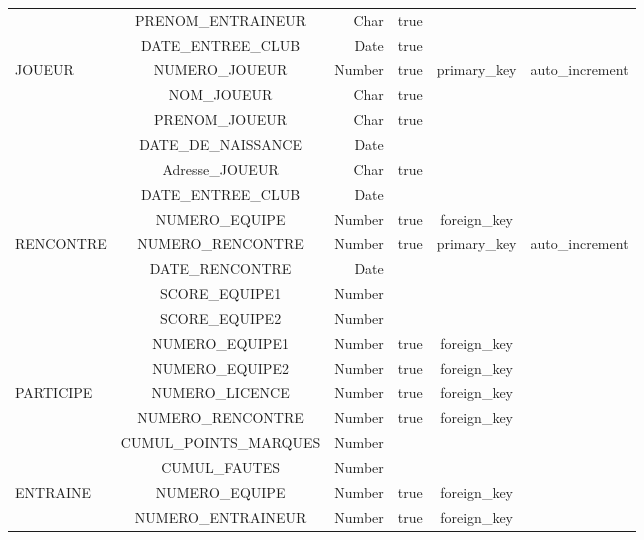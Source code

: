 \begin{center}
\begin{tabular}{|l|c|r|c|c|c|}
    \cline{2-6}
    & PRENOM\_ENTRAINEUR & Char & true & & \\
    \cline{2-6}
    & DATE\_ENTREE\_CLUB & Date & true & & \\
    \hline
    \hline
    JOUEUR & NUMERO\_JOUEUR & Number & true & primary\_key & auto\_increment\\
    \cline{2-6}
    & NOM\_JOUEUR & Char & true &  & \\
    \cline{2-6}
    & PRENOM\_JOUEUR & Char & true & & \\
    \cline{2-6}
    & DATE\_DE\_NAISSANCE & Date & & & \\
    \cline{2-6}
    & Adresse\_JOUEUR & Char & true &  & \\
    \cline{2-6}
    & DATE\_ENTREE\_CLUB & Date & & & \\
     \cline{2-6}
    & NUMERO\_EQUIPE & Number & true & foreign\_key & \\
    \hline
    \hline
    RENCONTRE & NUMERO\_RENCONTRE& Number & true & primary\_key & auto\_increment\\
    \cline{2-6}
    & DATE\_RENCONTRE & Date &  &  & \\
    \cline{2-6}
    & SCORE\_EQUIPE1 & Number &  & & \\
    \cline{2-6}
    & SCORE\_EQUIPE2 & Number &  & & \\
    \cline{2-6}
    & NUMERO\_EQUIPE1 & Number & true &  foreign\_key& \\
    \cline{2-6}
    & NUMERO\_EQUIPE2 & Number & true &  foreign\_key& \\
    \hline
    \hline
    PARTICIPE & NUMERO\_LICENCE & Number & true & foreign\_key & \\
    \cline{2-6}
    & NUMERO\_RENCONTRE & Number & true & foreign\_key & \\
    \cline{2-6}
    & CUMUL\_POINTS\_MARQUES & Number & & & \\
    \cline{2-6}
    & CUMUL\_FAUTES & Number & & & \\
    \hline
    \hline
    ENTRAINE & NUMERO\_EQUIPE & Number & true & foreign\_key & \\
    \cline{2-6}
    & NUMERO\_ENTRAINEUR & Number & true & foreign\_key & \\
    \hline
   
\end{tabular} 
\end{center}